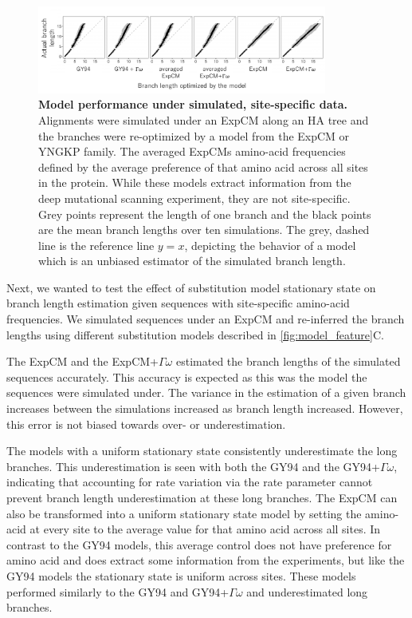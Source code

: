 \documentclass[11pt]{article}
\begin{document}
\begin{figure}[H]
\centerline{\includegraphics[width=0.85\textwidth]{figures/simulations}}
\caption{\label{simulations}
\textbf{Model performance under simulated, site-specific data.} 
Alignments were simulated under an ExpCM along an HA tree and the branches were re-optimized by a model from the ExpCM or YNGKP family. 
The averaged ExpCMs amino-acid frequencies defined by the average preference of that amino acid across all sites in the protein. 
While these models extract information from the deep mutational scanning experiment, they are not site-specific. 
Grey points represent the length of one branch and the black points are the mean branch lengths over ten simulations. 
The grey, dashed line is the reference line $y=x$, depicting the behavior of a model which is an unbiased estimator of the simulated branch length. 
}
\end{figure}

Next, we wanted to test the effect of substitution model stationary state on branch length estimation given sequences with site-specific amino-acid frequencies. 
We simulated sequences under an ExpCM and re-inferred the branch lengths using different substitution models described in \ref{fig:model_feature}C.

The ExpCM and the ExpCM+$\Gamma\omega$ estimated the branch lengths of the simulated sequences accurately. 
This accuracy is expected as this was the model the sequences were simulated under. 
The variance in the estimation of a given branch increases between the simulations increased as branch length increased. 
However, this error is not biased towards over- or underestimation. 

The models with a uniform stationary state consistently underestimate the long branches. 
This underestimation is seen with both the GY94 and the GY94+$\Gamma\omega$, indicating that accounting for rate variation via the rate parameter cannot prevent branch length underestimation at these long branches. 
The ExpCM can also be transformed into a uniform stationary state model by setting the amino-acid at every site to the average value for that amino acid across all sites. 
In contrast to the GY94 models, this average control does not have preference for amino acid and does extract some information from the experiments, but like the GY94 models the stationary state is uniform across sites. 
These models performed similarly to the GY94 and GY94+$\Gamma\omega$ and underestimated long branches. 
\end{document}
